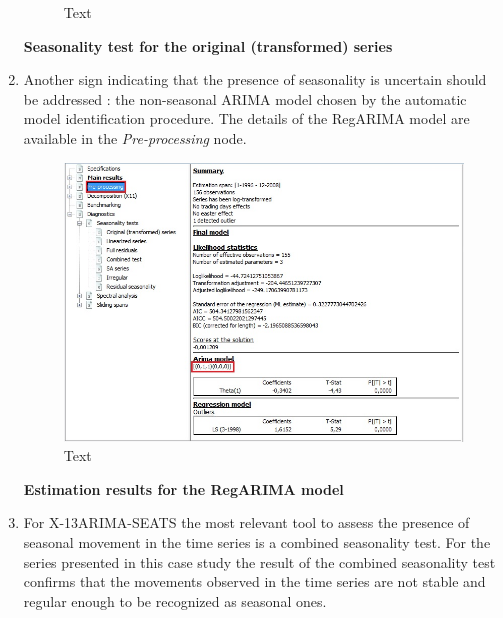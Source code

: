\documentclass[
  letterpaper,
  DIV=11,
  numbers=noendperiod]{scrreprt}
\begin{document}
\begin{enumerate}
\begin{figure}
{  }

  \caption{Text}

  \end{figure}

  \textbf{Seasonality test for the original (transformed) series}
\item
  Another sign indicating that the presence of seasonality is uncertain
  should be addressed : the non-seasonal ARIMA model chosen by the
  automatic model identification procedure. The details of the RegARIMA
  model are available in the \emph{Pre-processing} node.

  \begin{figure}

  {\centering \includegraphics{./All_images/UG_SA_image8.jpg}

  }

  \caption{Text}

  \end{figure}

  \textbf{Estimation results for the RegARIMA model}
\item
  For X-13ARIMA-SEATS the most relevant tool to assess the presence of
  seasonal movement in the time series is a combined seasonality test.
  For the series presented in this case study the result of the combined
  seasonality test confirms that the movements observed in the time
  series are not stable and regular enough to be recognized as seasonal
  ones.

  \begin{figure}


\end{figure}
\end{enumerate}
\end{document}

